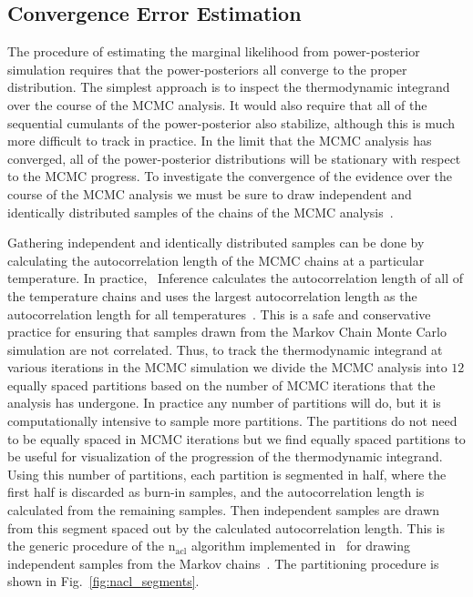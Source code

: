 \subsection{Convergence Error Estimation}
The procedure of estimating the marginal likelihood from power-posterior simulation requires that the power-posteriors all converge to the proper distribution. The simplest approach is to inspect the thermodynamic integrand over the course of the MCMC analysis. It would also require that all of the sequential cumulants of the power-posterior also stabilize, although this is much more difficult to track in practice. In the limit that the MCMC analysis has converged, all of the power-posterior distributions will be stationary with respect to the MCMC progress. To investigate the convergence of the evidence over the course of the MCMC analysis we must be sure to draw independent and identically distributed samples of the chains of the MCMC analysis~\cite{annis2019thermodynamic}.

Gathering independent and identically distributed samples can be done by calculating the autocorrelation length of the MCMC chains at a particular temperature. In practice, \pycbc{}\ Inference calculates the autocorrelation length of all of the temperature chains and uses the largest autocorrelation length as the autocorrelation length for all temperatures~\cite{biwer2019pycbc}. This is a safe and conservative practice for ensuring that samples drawn from the Markov Chain Monte Carlo simulation are not correlated. Thus, to track the thermodynamic integrand at various iterations in the MCMC simulation we divide the MCMC analysis into $12$ equally spaced partitions based on the number of MCMC iterations that the analysis has undergone. In practice any number of partitions will do, but it is computationally intensive to sample more partitions. The partitions do not need to be equally spaced in MCMC iterations but we find equally spaced partitions to be useful for visualization of the progression of the thermodynamic integrand. Using this number of partitions, each partition is segmented in half, where the first half is discarded as burn-in samples, and the autocorrelation length is calculated from the remaining samples. Then independent samples are drawn from this segment spaced out by the calculated autocorrelation length. This is the generic procedure of the $\mathrm{n_{acl}}$ algorithm implemented in \pycbc{}\ for drawing independent samples from the Markov chains~\cite{biwer2019pycbc}. The partitioning procedure is shown in Fig.~\ref{fig:nacl_segments}.

